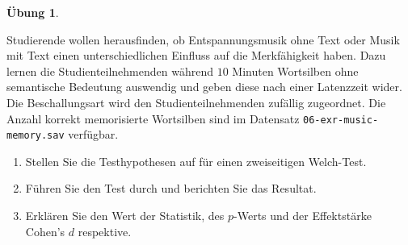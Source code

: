 \documentclass[
]{book}
\providecommand{\tightlist}{%
  \setlength{\itemsep}{0pt}\setlength{\parskip}{0pt}}
\theoremstyle{definition}
\theoremstyle{definition}
\theoremstyle{definition}
\newtheorem{exercise}{Übung}[chapter]
\theoremstyle{definition}
\theoremstyle{remark}
\begin{document}
\begin{exercise}
\protect\hypertarget{exr:music-memory}{}\label{exr:music-memory}\leavevmode

Studierende wollen herausfinden, ob Entspannungsmusik ohne Text oder Musik mit Text einen unterschiedlichen Einfluss auf die Merkfähigkeit haben. Dazu lernen die Studienteilnehmenden während \(10\) Minuten Wortsilben ohne semantische Bedeutung auswendig und geben diese nach einer Latenzzeit wider. Die Beschallungsart wird den Studienteilnehmenden zufällig zugeordnet. Die Anzahl korrekt memorisierte Wortsilben sind im Datensatz \texttt{06-exr-music-memory.sav} verfügbar.

\begin{enumerate}
\def\labelenumi{\alph{enumi})}
\tightlist
\item
  Stellen Sie die Testhypothesen auf für einen zweiseitigen Welch-Test.
\item
  Führen Sie den Test durch und berichten Sie das Resultat.
\item
  Erklären Sie den Wert der Statistik, des \(p\)-Werts und der Effektstärke Cohen's \(d\) respektive.
\end{enumerate}

\end{exercise}
\end{document}
